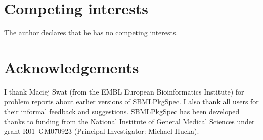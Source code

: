 \documentclass{bmcart}
\newcommand{\sbmlpkg}{SBMLPkgSpec}
\begin{document}

\begin{backmatter}

\section*{Competing interests}

The author declares that he has no competing interests.


\section*{Acknowledgements}

I thank Maciej Swat (from the EMBL European Bioinformatics Institute) for problem reports about earlier versions of \sbmlpkg.  I also thank all users for their informal feedback and suggestions.  \sbmlpkg{} has been developed thanks to funding from the National Institute of General Medical Sciences under grant R01~GM070923 (Principal Investigator: Michael Hucka).






\end{backmatter}
\end{document}
